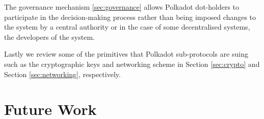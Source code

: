 The governance mechanism \ref{sec:governance} allows Polkadot dot-holders to participate in the decision-making process rather than being imposed changes to the system by a central authority or in the case of some decentralised systems, the developers of the system. 

Lastly we review some of the primitives that Polkadot sub-protocols are suing such as the cryptographic keys and networking scheme in Section \ref{sec:crypto} and Section \ref{sec:networking}, respectively. %

















\section{Future Work}




